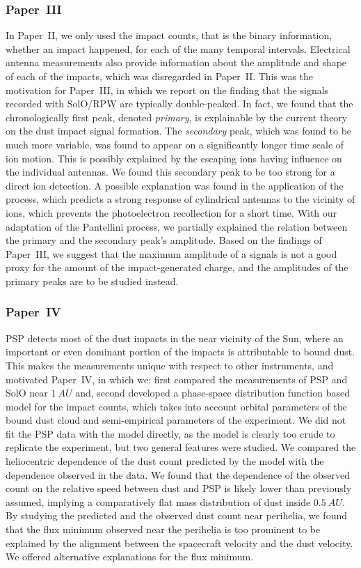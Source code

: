 \subsubsection{Paper~III}

In Paper~II, we only used the impact counts, that is the binary information, whether an impact happened, for each of the many temporal intervals. Electrical antenna measurements also provide information about the amplitude and shape of each of the impacts, which was disregarded in Paper~II. This was the motivation for Paper~III, in which we report on the finding that the signals recorded with SolO/RPW are typically double-peaked. In fact, we found that the chronologically first peak, denoted \textit{primary}, is explainable by the current theory on the dust impact signal formation. The \textit{secondary} peak, which was found to be much more variable, was found to appear on a significantly longer time scale of ion motion. This is possibly explained by the escaping ions having influence on the individual antennas. We found this secondary peak to be too strong for a direct ion detection. A possible explanation was found in the application of the \citet{pantellini2012nano} process, which predicts a strong response of cylindrical antennas to the vicinity of ions, which prevents the photoelectron recollection for a short time. With our adaptation of the Pantellini process, we partially explained the relation between the primary and the secondary peak's amplitude. Based on the findings of Paper~III, we suggest that the maximum amplitude of a signals is not a good proxy for the amount of the impact-generated charge, and the amplitudes of the primary peaks are to be studied instead. 

\subsubsection{Paper~IV}

PSP detects most of the dust impacts in the near vicinity of the Sun, where an important or even dominant portion of the impacts is attributable to bound dust. This makes the measurements unique with respect to other instruments, and motivated Paper~IV, in which we: first compared the measurements of PSP and SolO near $\SI{1}{AU}$ and, second developed a phase-space distribution function based model for the impact counts, which takes into account orbital parameters of the bound dust cloud and semi-empirical parameters of the experiment. We did not fit the PSP data with the model directly, as the model is clearly too crude to replicate the experiment, but two general features were studied. We compared the heliocentric dependence of the dust count predicted by the model with the dependence observed in the data. We found that the dependence of the observed count on the relative speed between dust and PSP is likely lower than previously assumed, implying a comparatively flat mass distribution of dust inside $\SI{0.5}{AU}$. By studying the predicted and the observed dust count near perihelia, we found that the flux minimum observed near the perihelia is too prominent to be explained by the alignment between the spacecraft velocity and the dust velocity. We offered alternative explanations for the flux minimum. 